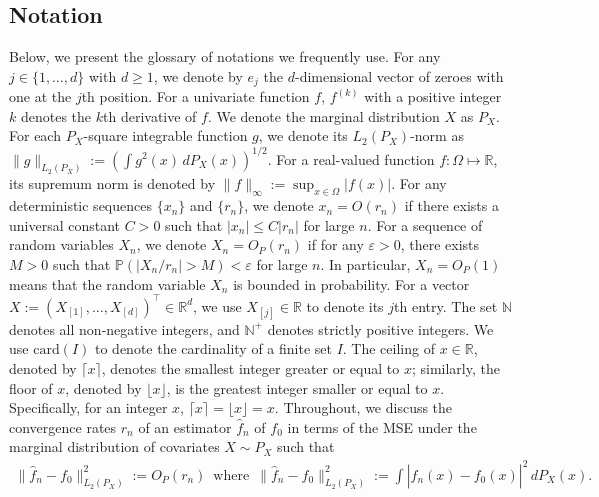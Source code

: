 \documentclass[12pt]{article}
\begin{document}
\subsection*{Notation} 
Below, we present the glossary of notations we frequently use. For any $j \in \{1,\ldots,d\}$ with $d \ge 1$, we denote by $e_j$ the $d$-dimensional vector of zeroes with one at the $j$th position. For a univariate function $f$, $f^{(k)}$ with a positive integer $k$ denotes the $k$th derivative of $f$. We denote the marginal distribution $X$ as $P_X$. For each $P_X$-square integrable function $g$, we denote its $L_2(P_X)$-norm as $\|g\|_{L_2(P_X)} := \left(\int g ^2(x) \, dP_X(x)\right)^{1/2}$. For a real-valued function $f : \Omega \mapsto \mathbb{R}$, its supremum norm is denoted by $\|f\|_\infty := \sup_{x \in\Omega}|f(x)|$. For any deterministic sequences $\{x_n\}$ and $\{r_n\}$, we denote $x_n = O(r_n)$ if there exists a universal constant $C>0$ such that $|x_n| \le C|r_n|$ for large $n$. For a sequence of random variables $X_n$, we denote $X_n = O_P(r_n)$ if for any $\varepsilon > 0$, there exists $M > 0$ such that $\mathbb{P}(|X_n/r_n| > M ) < \varepsilon$ for large $n$. In particular, $X_n = O_P(1)$ means that the random variable $X_n$ is bounded in probability. For a vector $X := (X_{[1]},\ldots,X_{[d]})^\top\in\mathbb{R}^d$, we use $X_{[j]}\in\mathbb{R}$ to denote its $j$th entry. The set $\mathbb{N}$ denotes all non-negative integers, and $\mathbb{N}^+$ denotes strictly positive integers. We use $\mathrm{card}(I)$ to denote the cardinality of a finite set $I$. The ceiling of $x\in \mathbb{R}$, denoted by $\lceil x \rceil$, denotes the smallest integer greater or equal to $x$; similarly, the floor of $x$, denoted by $\lfloor x \rfloor$, is the greatest integer smaller or equal to $x$. Specifically, for an integer $x$, $\lceil x \rceil =\lfloor x \rfloor = x$. Throughout, we discuss the convergence rates $r_n$ of an estimator $\widehat f_n$ of $f_0$ in terms of the MSE under the marginal distribution of covariates $X \sim P_X$ such that 
\begin{align}\label{def:rate-of-convergence}
    \|\widehat f_n - f_0\|^2_{L_2(P_X)}  := O_P(r_n)\, \text { where } \, \|\widehat f_n - f_0\|^2_{L_2(P_X)} := \int |\widehat f_n(x) - f_0(x)|^2 \, dP_X(x).
\end{align}
\end{document}
